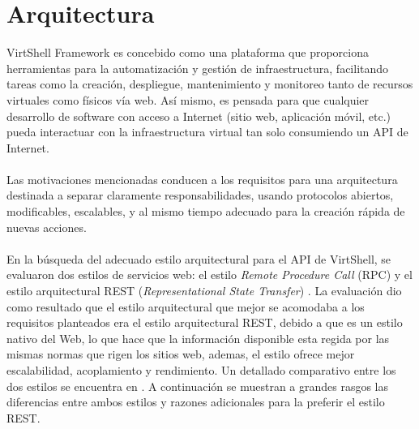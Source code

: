\chapter{Arquitectura}
\label{Arquitectura}
VirtShell Framework es concebido como una plataforma que proporciona herramientas para la automatización y gestión de infraestructura, facilitando tareas como la creación, despliegue, mantenimiento y monitoreo tanto de recursos virtuales como físicos vía web. Así mismo, es pensada para que cualquier desarrollo de software con acceso a Internet (sitio web, aplicación móvil, etc.) pueda interactuar con la infraestructura virtual tan solo consumiendo un API de Internet.\\
\\
Las motivaciones mencionadas conducen a los requisitos para una arquitectura destinada a separar claramente responsabilidades, usando protocolos abiertos, modificables, escalables, y al mismo tiempo adecuado para la creación rápida de nuevas acciones. \\
\\
En la búsqueda del adecuado estilo arquitectural para el API de VirtShell, se evaluaron dos estilos de servicios web: el estilo \emph{Remote Procedure Call} (RPC) y el estilo arquitectural REST (\emph{Representational State Transfer}) \cite{fielding00}. La evaluación dio como resultado que el estilo arquitectural que mejor se acomodaba a los requisitos planteados era el estilo arquitectural REST, debido a que es un estilo nativo del Web, lo que hace que la información disponible esta regida por las mismas normas que rigen los sitios web, ademas, el estilo ofrece mejor escalabilidad, acoplamiento y rendimiento. Un detallado comparativo entre los dos estilos se encuentra en \cite{Xinyang09}. A continuación se muestran a grandes rasgos las diferencias entre ambos estilos y razones adicionales para la preferir el estilo REST.

